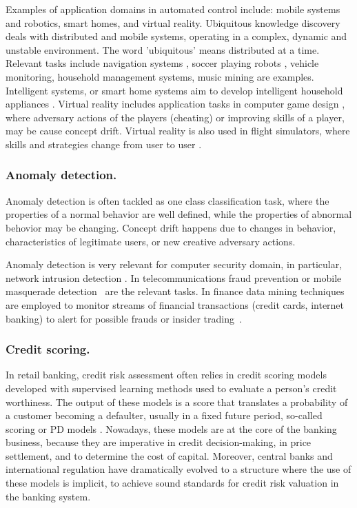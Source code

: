 \documentclass{llncs}
\begin{document}
Examples of application domains in automated control include: mobile systems and robotics, smart homes, and virtual reality.
Ubiquitous knowledge discovery deals with distributed and mobile systems, operating in a complex, dynamic and unstable environment.
The word 'ubiquitous' means distributed at a time.
Relevant tasks include navigation systems \cite{Thrun06}, soccer playing robots \cite{Lattner06}, vehicle monitoring, household management systems, music mining are examples.
Intelligent systems, or smart home systems \cite{Rashidi09} aim to develop intelligent household appliances \cite{Anguita01}.
Virtual reality includes application tasks in computer game design \cite{Charles05}, where adversary actions of the players (cheating) or improving skills of a player, may be cause concept drift. Virtual reality is also used in flight simulators, where skills and strategies change from user to user \cite{Harries98}.


\subsubsection{Anomaly detection.}

Anomaly detection is often tackled as one class classification task,
where the properties of a normal behavior are well defined, while the properties of abnormal behovior may be changing.
Concept drift happens due to changes in behavior, characteristics of legitimate users, or new creative adversary actions.

Anomaly detection is very relevant for computer security domain, in particular, network intrusion detection \cite{Lee00}.
In telecommunications fraud prevention \cite{Hilas09} or mobile masquerade detection~\cite{Mazhelis07} are the relevant tasks.
In finance data mining techniques are employed to monitor streams of financial transactions
(credit cards, internet banking) to alert for possible frauds or insider trading~\cite{Sudjianto10,Becker10,Hand10}.

\subsubsection{Credit scoring.}
In retail banking, credit risk assessment often relies in credit scoring models developed with supervised learning methods used to evaluate a person’s credit worthiness. The output of these models is a score that translates a probability of a customer becoming a defaulter, usually in a fixed future period, so-called scoring or PD models . Nowadays, these models are at the core of the banking business, because they are imperative in credit decision-making, in price settlement, and to determine the cost of capital. Moreover, central banks and international regulation have dramatically evolved to a structure where the use of these models is implicit, to achieve sound standards for credit risk valuation in the banking system.
\end{document}

